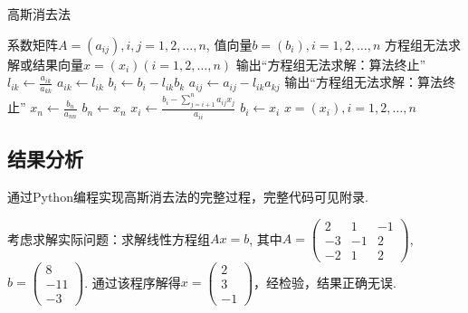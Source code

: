 \documentclass[UTF8,ctexart,a4paper,11pt,openany]{article}
\theoremstyle{definition}
\newcommand\e{\leftarrow}
\begin{document}
    \begin{algorithm}[H]
        \caption{高斯消去法}
        \begin{algorithmic}[1] %
            \Require 系数矩阵$A=(a_{ij}),i,j=1,2,\dots,n$, 值向量$b=(b_i),i=1,2,\dots,n$
            \Ensure 方程组无法求解或结果向量$x=(x_i)(i=1,2,\dots,n)$
                        \State 输出“方程组无法求解：算法终止”
                    \EndIf 
                        \State $l_{ik}\e \frac{a_{ik}}{a_{kk}}$
                        \State $a_{ik}\e l_{ik}$
                        \State $b_i\e b_i-l_{ik}b_k$
                            \State $a_{ij}\e a_{ij}-l_{ik}a_{kj}$
                        \EndFor
                    \EndFor 
                \EndFor 
                    \State 输出“方程组无法求解：算法终止”
                \Else 
                    \State $x_n\e \frac{b_n}{a_{nn}}$
                    \State $b_n\e x_n$
                        \State $x_i\e \frac{b_i-\sum_{j=i+1}^{n}a_{ij}x_j}{a_{ii}}$
                        \State $b_i\e x_i$
                    \EndFor
                \EndIf
                \State \Return $x=(x_i),i=1,2,\dots,n$
            \EndFunction
        \end{algorithmic}
    \end{algorithm}
    \subsection{结果分析}%
    通过Python编程实现高斯消去法的完整过程，完整代码可见附录. \par
    考虑求解实际问题：求解线性方程组$Ax=b$, 其中$A=\left(\begin{array}{ccc}2 & 1 & -1 \\ -3 & -1 & 2 \\ -2 & 1 & 2 \end{array}\right)$, $b=\left(\begin{array}{ccc}8 \\ -11 \\ -3\end{array}\right)$. 通过该程序解得$x=\left(\begin{array}{ccc}2 \\ 3 \\ -1\end{array}\right)$，经检验，结果正确无误.
    
\end{document}
